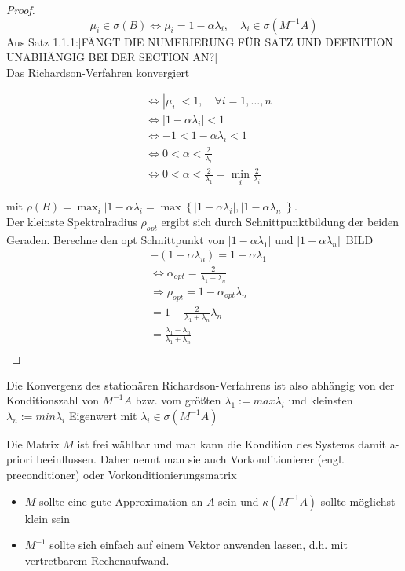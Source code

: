 \begin{proof}
   \begin{equation*}
     \mu_i \in \sigma(B) \Leftrightarrow \mu_i = 1-\alpha \lambda_i, \quad \lambda_i\in \sigma(M^{-1}A)
   \end{equation*}
   Aus Satz 1.1.1:[FÄNGT DIE NUMERIERUNG FÜR SATZ UND DEFINITION UNABHÄNGIG BEI DER SECTION AN?]\\
   Das Richardson-Verfahren konvergiert

   \begin{align*} 
     &\Leftrightarrow |\mu_i| <1, \quad \forall i = 1, \dots, n\\
     &\Leftrightarrow |1-\alpha\lambda_i| < 1\\
     &\Leftrightarrow -1 < 1 - \alpha \lambda_i < 1 \\
     &\Leftrightarrow 0 < \alpha < \frac{2}{\lambda_i} \\
     &\Leftrightarrow 0 < \alpha < \frac{2}{\lambda_1} = \min_i \frac{2}{\lambda_i}
   \end{align*}

   mit $\rho(B) = \max_i |1-\alpha\lambda_i = \max \left\{ |1-\alpha\lambda_i|, |1-\alpha\lambda_n| \right\}$.\\
   Der kleinste Spektralradius $\rho_{opt}$ ergibt sich durch Schnittpunktbildung der beiden Geraden. Berechne den opt Schnittpunkt von $|1-\alpha\lambda_1|$ und $|1-\alpha\lambda_n|$\
BILD
   \begin{align*}
     &-(1-\alpha\lambda_n) = 1-\alpha\lambda_1 \\
     &\Leftrightarrow \alpha_{opt} = \frac{2}{\lambda_1+\lambda_n}\\
     &\Rightarrow \rho_{opt} = 1-\alpha_{opt} \lambda_n\\
                             &= 1 - \frac{2}{\lambda_1+\lambda_n} \lambda_n\\ 
                             &= \frac{\lambda_1-\lambda_n}{\lambda_1+\lambda_n}\\
   \end{align*}
 \end{proof}

 Die Konvergenz des stationären Richardson-Verfahrens ist also abhängig von der Konditionszahl von $M^{-1}A$ bzw. vom größten $\lambda_1 := max \lambda_i$ und kleinsten $\lambda_n := min \lambda_i$ Eigenwert mit $\lambda_i \in \sigma(M^{-1}A)$

 \begin{bemerkung}
 Die Matrix $M$ ist frei wählbar und man kann die Kondition des Systems damit a-priori beeinflussen. Daher nennt man sie auch Vorkonditionierer (engl. preconditioner) oder Vorkonditionierungsmatrix
 \begin{itemize}
   \item $M$ sollte eine gute Approximation an $A$ sein und $\kappa(M^{-1}A)$ sollte möglichst klein sein
   \item $M^{-1}$ sollte sich einfach auf einem Vektor anwenden lassen, d.h. mit vertretbarem Rechenaufwand. 
 \end{itemize}
 \end{bemerkung}

